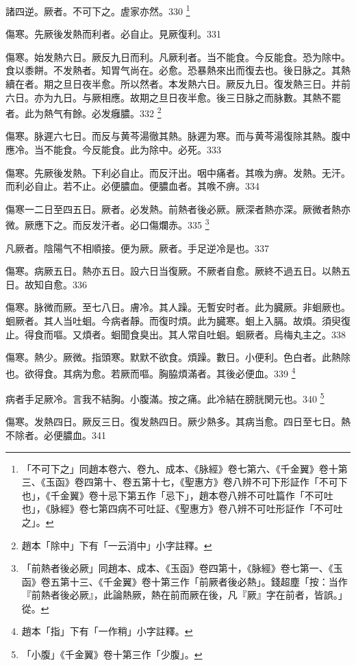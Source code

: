 諸四逆。厥者。不可下之。虗家亦然。330
	\footnote{
		「不可下之」同趙本卷六、卷九、成本、《脉經》卷七第六、《千金翼》卷十第三、《玉函》卷四第十、卷五第十七，《聖惠方》卷八辨不可下形証作「不可下也」，《千金翼》卷十忌下第五作「忌下」，趙本卷八辨不可吐篇作「不可吐也」，《脉經》卷七第四病不可吐証、《聖惠方》卷八辨不可吐形証作「不可吐之」。
	}

傷寒。先厥後发熱而利者。必自止。見厥復利。331

傷寒。始发熱六日。厥反九日而利。凡厥利者。当不能食。今反能食。恐为除中。食以黍餅。不发熱者。知胃气尚在。必愈。恐暴熱來出而復去也。後日脉之。其熱續在者。期之旦日夜半愈。所以然者。本发熱六日。厥反九日。復发熱三日。并前六日。亦为九日。与厥相應。故期之旦日夜半愈。後三日脉之而脉數。其熱不罷者。此为熱气有餘。必发癰膿。332
	\footnote{
		趙本「除中」下有「一云消中」小字註釋。
	}

傷寒。脉遲六七日。而反与黄芩湯徹其熱。脉遲为寒。而与黄芩湯復除其熱。腹中應冷。当不能食。今反能食。此为除中。必死。333

傷寒。先厥後发熱。下利必自止。而反汗出。咽中痛者。其㗋为痹。发熱。无汗。而利必自止。若不止。必便膿血。便膿血者。其㗋不痹。334

傷寒一二日至四五日。厥者。必发熱。前熱者後必厥。厥深者熱亦深。厥微者熱亦微。厥應下之。而反发汗者。必口傷爛赤。335
	\footnote{
		「前熱者後必厥」同趙本、成本、《玉函》卷四第十，《脉經》卷七第一、《玉函》卷五第十三、《千金翼》卷十第三作「前厥者後必熱」。錢超塵「按：当作『前熱者後必厥』，此論熱厥，熱在前而厥在後，凡『厥』字在前者，皆誤。」從。
	}

凡厥者。陰陽气不相順接。便为厥。厥者。手足逆冷是也。337

傷寒。病厥五日。熱亦五日。設六日当復厥。不厥者自愈。厥終不過五日。以熱五日。故知自愈。336

傷寒。脉微而厥。至七八日。膚冷。其人躁。无暫安时者。此为臓厥。非蛔厥也。蛔厥者。其人当吐蛔。今病者靜。而復时煩。此为臓寒。蛔上入膈。故煩。須臾復止。得食而嘔。又煩者。蛔聞食臭出。其人常自吐蛔。蛔厥者。烏梅丸主之。338

傷寒。熱少。厥微。指頭寒。默默不欲食。煩躁。數日。小便利。色白者。此熱除也。欲得食。其病为愈。若厥而嘔。胸脇煩滿者。其後必便血。339
	\footnote{
		趙本「指」下有「一作稍」小字註釋。
	}

病者手足厥冷。言我不結胸。小腹滿。按之痛。此冷結在膀胱関元也。340
	\footnote{
		「小腹」《千金翼》卷十第三作「少腹」。
	}

傷寒。发熱四日。厥反三日。復{\khaai 发}熱四日。厥少熱多。其病当愈。四日至七日。熱不除者。必便膿血。341

